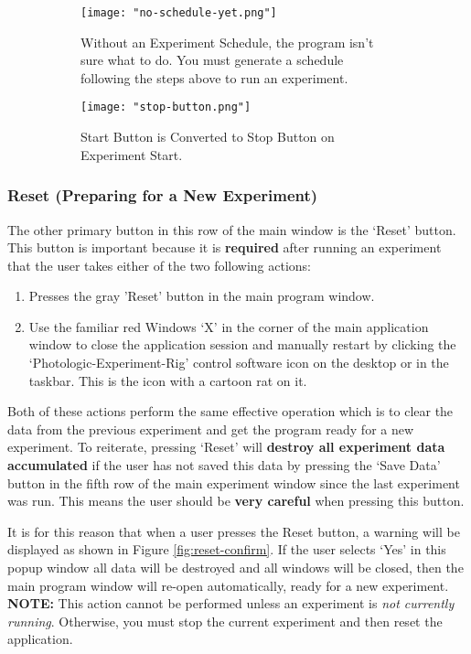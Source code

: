 \documentclass{article}
\begin{document}
\begin{figure}[h!]
    \centering
    \begin{subfigure}[t]{.45\textwidth}
        \centering
        \texttt{[image: "no-schedule-yet.png"]}
        \caption{Without an Experiment Schedule, the program isn't sure what to do. You must generate a schedule following the steps above to run an experiment.}
        \label{fig:no-schedule}
    \end{subfigure}
    \hfill
    \begin{subfigure}[t]{.45\textwidth}
        \centering
        \texttt{[image: "stop-button.png"]}
        \caption{Start Button is Converted to Stop Button on Experiment Start.}
        \label{fig:stop-button}
    \end{subfigure}
    \caption{}
    \label{fig:pg_admin_figs}
\end{figure}
\FloatBarrier

\subsubsection{Reset (Preparing for a New Experiment)}
The other primary button in this row of the main window is the `Reset' button. This button is important because it is \textbf{required} after 
running an experiment that the user takes either of the two following actions:
\begin{enumerate}
    \item Presses the gray 'Reset' button in the main program window. 
    \item Use the familiar red Windows `X' in the corner of the main application window to close the application session and manually 
        restart by clicking the `Photologic-Experiment-Rig' control software icon on the desktop or in the taskbar. This is the icon 
        with a cartoon rat on it. 
\end{enumerate}

Both of these actions perform the same effective operation which is to clear the data from the previous experiment and get
the program ready for a new experiment. To reiterate, pressing `Reset' will \textbf{destroy all experiment data accumulated} if the user 
has not saved this data by pressing the `Save Data' button in the fifth row of the main experiment window since the last experiment was run.
This means the user should be \textbf{very careful} when pressing this button. 

It is for this reason that when a user presses the Reset button, a warning will be displayed as shown in Figure \ref{fig:reset-confirm}. If the user selects `Yes' in this 
popup window all data will be destroyed and all windows will be closed, then the main program window will re-open automatically, ready for a new experiment.
\newline
\newline
\textbf{NOTE:} This action cannot be performed unless an experiment is \textit{not currently running}. Otherwise, you must stop the current experiment and then reset the 
application.
\end{document}
